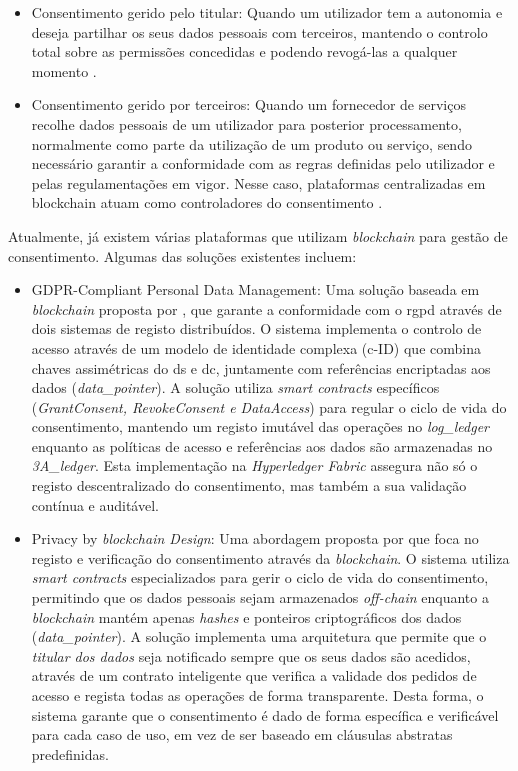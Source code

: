 \begin{itemize}
    \item Consentimento gerido pelo titular: Quando um utilizador tem a autonomia e deseja partilhar os seus dados pessoais com terceiros, mantendo o controlo total sobre as permissões concedidas e podendo revogá-las a qualquer momento \citep{Merlec2021}.
    \item Consentimento gerido por terceiros: Quando um fornecedor de serviços recolhe dados pessoais de um utilizador para posterior processamento, normalmente como parte da utilização de um produto ou serviço, sendo necessário garantir a conformidade com as regras definidas pelo utilizador e pelas regulamentações em vigor. Nesse caso, plataformas centralizadas em blockchain atuam como controladores do consentimento \citep{Aldred2019}.
\end{itemize}

Atualmente, já existem várias plataformas que utilizam \textit{blockchain} para gestão de consentimento. 
Algumas das soluções existentes incluem:

\begin{itemize}
    \item GDPR-Compliant Personal Data Management: Uma solução baseada em \textit{blockchain} proposta por \citep{nguyen2020gdpr}, que garante a conformidade com o \acrshort{rgpd} através de dois sistemas de registo distribuídos. O sistema implementa o controlo de acesso através de um modelo de identidade complexa (c-ID) que combina chaves assimétricas do \acrshort{ds} e \acrshort{dc}, juntamente com referências encriptadas aos dados (\textit{data\_pointer}). A solução utiliza \textit{smart contracts} específicos (\textit{GrantConsent, RevokeConsent e DataAccess}) para regular o ciclo de vida do consentimento, mantendo um registo imutável das operações no \textit{log\_ledger} enquanto as políticas de acesso e referências aos dados são armazenadas no \textit{3A\_ledger}. Esta implementação na \textit{Hyperledger Fabric} assegura não só o registo descentralizado do consentimento, mas também a sua validação contínua e auditável.

    \item Privacy by \textit{blockchain Design}: Uma abordagem proposta por \citep{wirth2018privacy} que foca no registo e verificação do consentimento através da \textit{blockchain}. O sistema utiliza \textit{smart contracts} especializados para gerir o ciclo de vida do consentimento, permitindo que os dados pessoais sejam armazenados \textit{off-chain} enquanto a \textit{blockchain} mantém apenas \textit{hashes} e ponteiros criptográficos dos dados (\textit{data\_pointer}). A solução implementa uma arquitetura que permite que o \textit{titular dos dados} seja notificado sempre que os seus dados são acedidos, através de um contrato inteligente que verifica a validade dos pedidos de acesso e regista todas as operações de forma transparente. Desta forma, o sistema garante que o consentimento é dado de forma específica e verificável para cada caso de uso, em vez de ser baseado em cláusulas abstratas predefinidas.
\end{itemize}

